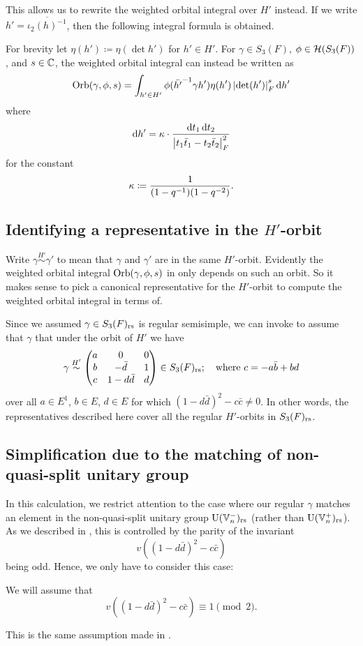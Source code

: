 This allows us to rewrite the weighted orbital integral over $H'$ instead.
If we write $h' = \overline{\iota_2(h)^{-1}}$,
then the following integral formula is obtained.
\begin{proposition}
  \label{prop:orbital_over_H_prime}
  For brevity let $\eta(h') \coloneqq \eta(\det h')$ for $h' \in H'$.
  For $\gamma \in S_3(F)$, $\phi \in \mathcal H(S_3(F))$, and $s \in \mathbb C$,
  the weighted orbital integral can instead be written as
  \[ \Orb(\gamma, \phi, s) =
    \int_{h' \in H'} \phi(\bar{h'}\inv \gamma h') \eta(h')
    \left\lvert \det(h') \right\rvert_F^{s} \odif{h'} \]
  where
  \[ \odif{h'} = \kappa \cdot \frac{\odif t_1 \odif t_2}
    {\left\lvert t_1 \bar t_1 - t_2 \bar t_2 \right\rvert_F^2} \]
  for the constant
  \[ \kappa \coloneqq \frac{1}{(1-q^{-1})(1-q^{-2})}. \]
\end{proposition}

\subsection{Identifying a representative in the $H'$-orbit}
Write $\gamma \overset{H'}{\sim} \gamma'$ to mean that $\gamma$ and $\gamma'$
are in the same $H'$-orbit.
Evidently the weighted orbital integral $\operatorname{Orb}(\gamma, \phi, s)$ in 
only depends on such an orbit.
So it makes sense to pick a canonical representative for the $H'$-orbit to compute
the weighted orbital integral in terms of.

Since we assumed $\gamma \in S_3(F)_{\mathrm{rs}}$ is regular semisimple,
we can invoke \cite[Proposition 4.1]{ref:AFL}
to assume that $\gamma$ that under the orbit of $H'$ we have
\[ \gamma \overset{H'}{\sim}
  \begin{pmatrix}
    a & 0 & 0 \\
    b & - \bar d & 1 \\
    c & 1 - d \bar d & d
  \end{pmatrix}
  \in S_3(F)_{\mathrm{rs}}; \quad \text{where $c = -a \bar b + b d$} \]
over all $a \in E^1$, $b \in E$, $d \in E$ for which $(1-d\bar d)^2 - c \bar c \neq 0$.
In other words, the representatives described here cover all the regular $H'$-orbits in $S_3(F)_{\mathrm{rs}}$.

\subsection{Simplification due to the matching of non-quasi-split unitary group}
In this calculation, we restrict attention to the case where our regular $\gamma$
matches an element in the non-quasi-split unitary group $\operatorname{U}(\mathbb V_n^-)_{\mathrm{rs}}$
(rather than $\operatorname{U}(\mathbb V_n^+)_{\mathrm{rs}}$).
As we described in ,
this is controlled by the parity of the invariant
\[ v\left( (1-d\bar d)^2 - c \bar c\right) \]
being odd.
Hence, we only have to consider this case:
\begin{assume}
  \label{assume:u_odd}
  We will assume that
  \[ v\left( (1-d\bar d)^2 - c \bar c\right) \equiv 1 \pmod 2. \]
\end{assume}
This is the same assumption made in \cite[Equation (4.3)]{ref:AFL}.

